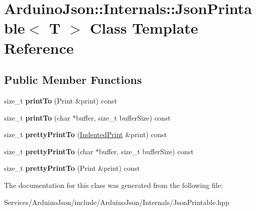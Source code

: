 \hypertarget{class_arduino_json_1_1_internals_1_1_json_printable}{}\section{Arduino\+Json\+:\+:Internals\+:\+:Json\+Printable$<$ T $>$ Class Template Reference}
\label{class_arduino_json_1_1_internals_1_1_json_printable}
\subsection*{Public Member Functions}
\begin{DoxyCompactItemize}
\item 
\hypertarget{class_arduino_json_1_1_internals_1_1_json_printable_a196e6bbbbcc098504cb44b659a6f158b}{}size\+\_\+t {\bfseries print\+To} (Print \&print) const \label{class_arduino_json_1_1_internals_1_1_json_printable_a196e6bbbbcc098504cb44b659a6f158b}

\item 
\hypertarget{class_arduino_json_1_1_internals_1_1_json_printable_a22891b58af25ae55a70743a8c5ea1395}{}size\+\_\+t {\bfseries print\+To} (char $\ast$buffer, size\+\_\+t buffer\+Size) const \label{class_arduino_json_1_1_internals_1_1_json_printable_a22891b58af25ae55a70743a8c5ea1395}

\item 
\hypertarget{class_arduino_json_1_1_internals_1_1_json_printable_af16a5340d0119c7775646a886adc414c}{}size\+\_\+t {\bfseries pretty\+Print\+To} (\hyperlink{class_arduino_json_1_1_internals_1_1_indented_print}{Indented\+Print} \&print) const \label{class_arduino_json_1_1_internals_1_1_json_printable_af16a5340d0119c7775646a886adc414c}

\item 
\hypertarget{class_arduino_json_1_1_internals_1_1_json_printable_a03bcf4647271406978c558ad7d6e2754}{}size\+\_\+t {\bfseries pretty\+Print\+To} (char $\ast$buffer, size\+\_\+t buffer\+Size) const \label{class_arduino_json_1_1_internals_1_1_json_printable_a03bcf4647271406978c558ad7d6e2754}

\item 
\hypertarget{class_arduino_json_1_1_internals_1_1_json_printable_ad9d30b93923cb5b5dbc8f5c9fb4c415f}{}size\+\_\+t {\bfseries pretty\+Print\+To} (Print \&print) const \label{class_arduino_json_1_1_internals_1_1_json_printable_ad9d30b93923cb5b5dbc8f5c9fb4c415f}

\end{DoxyCompactItemize}


The documentation for this class was generated from the following file\+:\begin{DoxyCompactItemize}
\item 
Services/\+Arduino\+Json/include/\+Arduino\+Json/\+Internals/Json\+Printable.\+hpp\end{DoxyCompactItemize}
